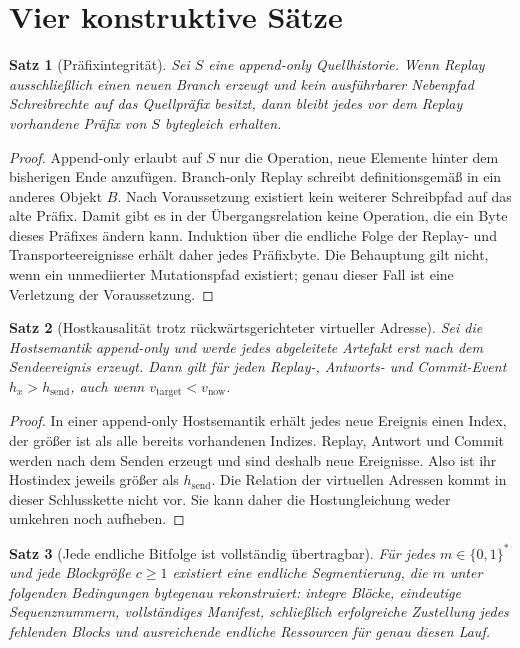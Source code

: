 \documentclass[11pt,a4paper]{article}
\newtheorem{satz}{Satz}[section]
\theoremstyle{remark}
\newcommand{\bytes}{\{0,1\}^{*}}
\begin{document}
\section{Vier konstruktive Sätze}

\begin{satz}[Präfixintegrität]\label{thm:prefix}
Sei \(S\) eine append-only Quellhistorie. Wenn Replay ausschließlich einen
neuen Branch erzeugt und kein ausführbarer Nebenpfad Schreibrechte auf das
Quellpräfix besitzt, dann bleibt jedes vor dem Replay vorhandene Präfix von
\(S\) bytegleich erhalten.
\end{satz}

\begin{proof}
Append-only erlaubt auf \(S\) nur die Operation, neue Elemente hinter dem
bisherigen Ende anzufügen. Branch-only Replay schreibt definitionsgemäß in
ein anderes Objekt \(B\). Nach Voraussetzung existiert kein weiterer
Schreibpfad auf das alte Präfix. Damit gibt es in der Übergangsrelation keine
Operation, die ein Byte dieses Präfixes ändern kann. Induktion über die
endliche Folge der Replay- und Transporteereignisse erhält daher jedes
Präfixbyte. Die Behauptung gilt nicht, wenn ein unmediierter Mutationspfad
existiert; genau dieser Fall ist eine Verletzung der Voraussetzung.
\end{proof}

\begin{satz}[Hostkausalität trotz rückwärtsgerichteter virtueller Adresse]
\label{thm:host}
Sei die Hostsemantik append-only und werde jedes abgeleitete Artefakt erst
nach dem Sendeereignis erzeugt. Dann gilt für jeden Replay-, Antworts- und
Commit-Event \(h_x>h_{\mathrm{send}}\), auch wenn
\(v_{\mathrm{target}}<v_{\mathrm{now}}\).
\end{satz}

\begin{proof}
In einer append-only Hostsemantik erhält jedes neue Ereignis einen Index, der
größer ist als alle bereits vorhandenen Indizes. Replay, Antwort und Commit
werden nach dem Senden erzeugt und sind deshalb neue Ereignisse. Also ist
ihr Hostindex jeweils größer als \(h_{\mathrm{send}}\). Die Relation der
virtuellen Adressen kommt in dieser Schlusskette nicht vor. Sie kann daher
die Hostungleichung weder umkehren noch aufheben.
\end{proof}

\begin{satz}[Jede endliche Bitfolge ist vollständig übertragbar]
\label{thm:finite}
Für jedes \(m\in\bytes\) und jede Blockgröße \(c\geq1\) existiert eine
endliche Segmentierung, die \(m\) unter folgenden Bedingungen bytegenau
rekonstruiert: integre Blöcke, eindeutige Sequenznummern, vollständiges
Manifest, schließlich erfolgreiche Zustellung jedes fehlenden Blocks und
ausreichende endliche Ressourcen für genau diesen Lauf.
\end{satz}
\end{document}
